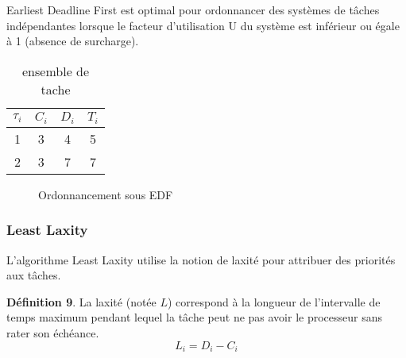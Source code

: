 \begin{theoreme}
Earliest Deadline First est optimal pour ordonnancer des systèmes de tâches indépendantes lorsque le facteur d'utilisation U du système est inférieur ou égale à 1 (absence de surcharge).
\end{theoreme}

\begin{table}[h]
\begin{center}
\begin{tabular}{|c|c|c|c|}
 \hline$\tau_i$ & $C_i$ & $D_i$ & $T_i$\\ 
 \hline1 & 3 & 4 & 5\\ 
 \hline2 & 3 & 7 & 7 \\  
 \hline
 \end{tabular}
\end{center}
\caption{ensemble de tache } \label{tab:exempleEDF}
\end{table}

\begin{figure}[h]
\begin{center}
\begin{RTGrid}[height=4cm,width=12cm,labelsize=8pt,numbersize=6]{2}{16}




\end{RTGrid}
\caption{Ordonnancement sous EDF} \label{fig:exempleEDF}
\end{center}
\end{figure}

\subsubsection{Least Laxity}
\vspace{-1cm}
L'algorithme Least Laxity \cite{Mok83}utilise la notion de laxité pour attribuer des priorités aux tâches.

\textbf{Définition 9}. La laxité (notée $L$) correspond à la longueur de l'intervalle de temps maximum pendant lequel la tâche peut ne pas avoir le processeur sans rater son échéance.
\begin{equation}
L_i = D_i - C_i
\end{equation}

